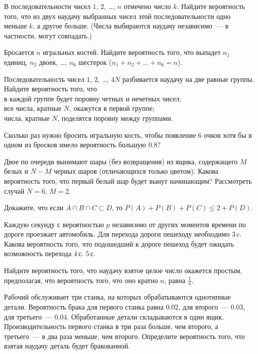 

\begin{problems}

\item
В последовательности чисел $1$, $2$, \ldots, $n$ отмечено число $k$.
Найдите вероятность того, что из двух наудачу выбранных чисел этой
последовательности одно меньше $k$, а другое больше.
(Числа выбираются наудачу независимо~--- в частности, могут совпадать.)

\item
Бросается $n$ игральных костей.
Найдите вероятность того, что выпадет
$n_1$ единиц, $n_2$ двоек, \ldots, $n_6$ шестерок
($n_1 + n_2 + \ldots + n_6 = n$).

\item
Последовательность чисел $1$, $2$, \ldots, $4N$ разбивается наудачу на две
равные группы.
Найдите вероятность того, что
\\
\sbp в каждой группе будет поровну четных и нечетных чисел;
\\
\sbp все числа, кратные $N$, окажутся в первой группе;
\\
\sbp числа, кратные $N$, поделятся поровну между группами.

\item
Сколько раз нужно бросить игральную кость, чтобы появление $6$ очков хотя бы в
одном из бросков имело вероятность большую $0.8$?

\item
Двое по очереди вынимают шары (без возвращения) из ящика, содержащего
$M$ белых и $N - M$ черных шаров (отличающихся только цветом).
Какова вероятность того, что первый белый шар будет вынут начинающим?
Рассмотреть случай $N = 6$, $M = 2$.

\item
Докажите, что если
$A \cap B \cap C \subset D$,
то
$P(A) + P(B) + P(C) \leq 2 + P(D)$.

\item
Каждую секунду с вероятностью $p$ независимо от других моментов времени по
дороге проезжает автомобиль.
Для перехода дороги пешеходу необходимо $3\,\text{c.}$
Какова вероятность того, что подошедший к дороге пешеход будет ожидать
возможность перехода
\quad
\sbp $4\,\text{с.}$
\quad
\sbp $5\,\text{с.}$

\item
Найдите вероятность того, что наудачу взятое целое число окажется простым,
предполагая, что вероятность того, что оно кратно $n$, равна $\frac{1}{n}$.

\item
Рабочий обслуживает три станка, на которых обрабатываются однотипные детали.
Вероятность брака для первого станка равна $0.02$, для второго~--- $0.03$,
для третьего~--- $0.04$.
Обработанные детали складываются в один ящик.
Производительность первого станка в три раза больше, чем второго, а
третьего~--- в два раза меньше, чем второго.
Определите вероятность того, что взятая наудачу деталь будет бракованной.

\end{problems}
